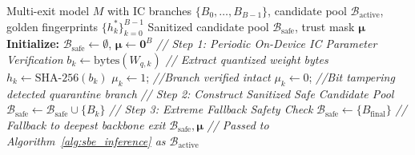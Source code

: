 \documentclass[conference,10pt]{IEEEtran}
\begin{document}
\begin{algorithm}[tb!]
\caption{Phase 2: Intra-Model IC Checksum Verification \& Quarantine}
\label{alg:checksum_quarantine}
\begin{algorithmic}[1]
\renewcommand{\algorithmicrequire}{\textbf{Input:}}
\renewcommand{\algorithmicensure}{\textbf{Output:}}
\REQUIRE Multi-exit model $M$ with IC branches $\{B_0, \dots, B_{B-1}\}$, candidate pool $\mathcal{B}_{\text{active}}$, golden fingerprints $\{h_k^*\}_{k=0}^{B-1}$
\ENSURE Sanitized candidate pool $\mathcal{B}_{\text{safe}}$, trust mask $\boldsymbol{\mu}$
\STATE \textbf{Initialize:} $\mathcal{B}_{\text{safe}} \leftarrow \emptyset$, $\boldsymbol{\mu} \leftarrow \mathbf{0}^B$
\STATE \textit{// Step 1: Periodic On-Device IC Parameter Verification}
    \STATE $b_k \leftarrow \text{bytes}(W_{q, k})$ \quad \textit{// Extract quantized weight bytes}
    \STATE $h_k \leftarrow \text{SHA-256}(b_k)$
        \STATE $\mu_k \leftarrow 1$; \textit{//Branch verified intact}
    \ELSE
        \STATE $\mu_k \leftarrow 0$; \textit{//Bit tampering detected quarantine branch}
    \ENDIF
\ENDFOR
\STATE \textit{// Step 2: Construct Sanitized Safe Candidate Pool}
        \STATE $\mathcal{B}_{\text{safe}} \leftarrow \mathcal{B}_{\text{safe}} \cup \{B_k\}$
    \ENDIF
\ENDFOR
\STATE \textit{// Step 3: Extreme Fallback Safety Check}
    \STATE $\mathcal{B}_{\text{safe}} \leftarrow \{B_{\text{final}}\}$ \quad \textit{// Fallback to deepest backbone exit}
\ENDIF
\RETURN $\mathcal{B}_{\text{safe}}, \boldsymbol{\mu}$ \quad \textit{// Passed to Algorithm~\ref{alg:sbe_inference} as $\mathcal{B}_{\text{active}}$}
\end{algorithmic}
\end{algorithm}
\end{document}
